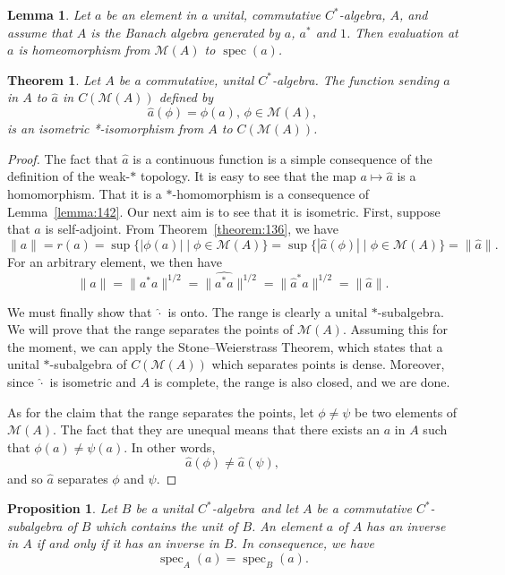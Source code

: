 \documentclass{book}
\newtheorem{lemma}[definition]{Lemma}
\newtheorem{proposition}[definition]{Proposition}
\newtheorem{theorem}[definition]{Theorem}
\def\cstar{\(C^*\)-algebra}
\begin{document}
\begin{lemma}
  Let \(a\) be an element in a unital, commutative \cstar,
  \(A\), and assume that \(A\) is the Banach algebra generated by \(a\), \(a^*\) and \(1\). Then
  evaluation at \(a\) is homeomorphism from \(\mathcal{M}(A)\) to \(\operatorname{spec}(a)\).
\end{lemma}
\begin{theorem}\label{theorem:146}\label{Petersen:116}
  Let \(A\) be a commutative, unital \cstar. The function
  sending \(a\) in \(A\) to \(\hat{a}\) in \(C(\mathcal{M}(A))\) defined by
  \[
    \hat{a}(\phi) = \phi(a)\text{, }\phi\in\mathcal{M}(A),
  \]
  is an isometric *-isomorphism from \(A\) to \(C(\mathcal{M}(A))\).
\end{theorem}
\begin{proof}
  The fact that $\hat a$ is a continuous function is a simple 
  consequence of the definition of the weak-$*$ topology. 
  It is easy to see that the map $a \mapsto \hat a$ is a 
  homomorphism. That it is a $*$-homomorphism is a 
  consequence of Lemma~\ref{lemma:142}. Our next aim is 
  to see that it is isometric. First, suppose that $a$ 
  is self-adjoint. From Theorem~\ref{theorem:136}, we 
  have 
  \[ \|a\| = r(a) = \sup\{ |\phi(a)| \mid \phi \in \mathcal{M}(A)\} = \sup\{ |\hat a(\phi)| \mid \phi \in \mathcal{M}(A)\} = \|\hat a\|. \] 
  For an arbitrary element, we then have 
  \[ \|a\| = \|a^*a\|^{1/2} = \|\hat{a^*a}\|^{1/2} = \|\hat a^* \hat a\|^{1/2} = \|\hat a\|. \]\par 
  We must finally show that $\hat{\cdot}$ is onto. 
  The range is clearly a unital $*$-subalgebra. 
  We will prove that the range separates the points of $\mathcal{M}(A)$. 
  Assuming this for the moment, we can apply the Stone--Weierstrass Theorem, 
  which states that a unital $*$-subalgebra of $C(\mathcal{M}(A))$ which separates points is dense. 
  Moreover, since $\hat{\cdot}$ is isometric and $A$ is complete, 
  the range is also closed, and we are done.\par 
  As for the claim that the range separates the points, 
  let $\phi \neq \psi$ be two elements of $\mathcal{M}(A)$. 
  The fact that they are unequal means that there exists 
  an $a$ in $A$ such that $\phi(a) \neq \psi(a)$. 
  In other words, \[ \hat a(\phi) \neq \hat a(\psi), \] 
  and so $\hat a$ separates $\phi$ and $\psi$.
\end{proof}
\begin{proposition}
  Let \(B\) be a unital \cstar\ and let \(A\) be a commutative
  \(C^*\)-subalgebra of \(B\) which contains the unit of \(B\). An element \(a\) of \(A\) has an
  inverse in \(A\) if and only if it has an inverse in \(B\). In consequence, we have
  \[
    \operatorname{spec}_A(a) = \operatorname{spec}_B(a).
  \]
\end{proposition}
\end{document}
